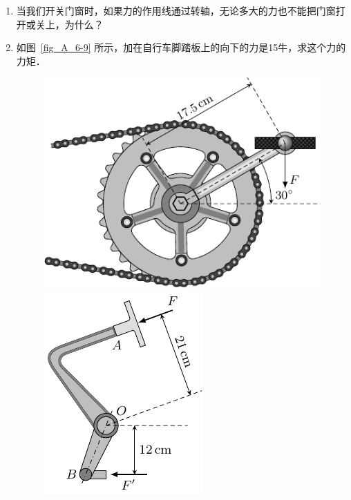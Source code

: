 \begin{enumerate}
    \item 当我们开关门窗时，如果力的作用线通过转轴，无论多大的力也不能把门窗打开或关上，为什么？
    \item 如图~\ref{fig_A_6-9} 所示，加在自行车脚踏板上的向下的力是15牛，求这个力的力矩．
    
   \begin{figure}[htbp]
        \centering
        \begin{minipage}[t]{0.48\textwidth}
            \centering
            \includegraphics{fig/A/6-9.pdf}
            \caption{}\label{fig_A_6-9}
        \end{minipage}
        \begin{minipage}[t]{0.48\textwidth}
            \centering
            \includegraphics{fig/A/6-10.pdf}
            \caption{}\label{fig_A_6-10}
        \end{minipage}
   \end{figure}


\end{enumerate}

